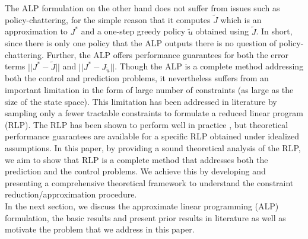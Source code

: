 The ALP formulation \cite{ALP} on the other hand does not suffer from issues such as policy-chattering, for the simple reason that it computes $\tilde{J}$ which is an approximation to $J^*$ and a one-step greedy policy $\tilde{u}$ obtained using $\tilde{J}$. In short, since there is only one policy that the ALP outputs there is no question of policy-chattering. Further, the ALP offers performance guarantees for both the error terms $||J^*-\tilde{J}||$ and $||J^*-J_{\tilde{u}}||$. Though the ALP is a complete method addressing both the control and prediction problems, it nevertheless suffers from an important limitation in the form of large number of constraints (as large as the size of the state space). This limitation has been addressed in literature by sampling only a fewer tractable constraints to formulate a reduced linear program (RLP). The RLP has been shown to perform well in practice \cite{ALP,CS,CST}, but theoretical performance guarantees \cite{CS} are available for a specific RLP obtained under idealized assumptions. In this paper, by providing a sound theoretical analysis of the RLP, we aim to show that RLP is a complete method that addresses both the prediction and the control problems.
We achieve this by developing and presenting a comprehensive theoretical framework to understand the constraint reduction/approximation procedure.\\
In the next section, we discuss the approximate linear programming (ALP) formulation, the basic results and present prior results in literature as well as motivate the problem that we address in this paper. 

